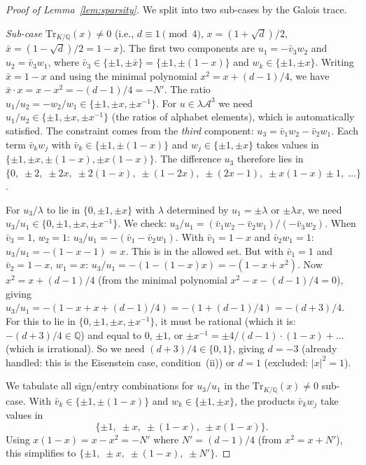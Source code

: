 \documentclass[12pt,a4paper]{article}
\newcommand{\Q}{\mathbb{Q}}
\newcommand{\Tr}[1]{\mathrm{Tr}_{K/\Q}\!\left(#1\right)}
\begin{document}
\begin{proof}[Proof of Lemma~\ref{lem:sparsity}]
We split into two sub-cases by the Galois trace.

\emph{Sub-case $\Tr{x} \neq 0$} (i.e., $d \equiv 1 \pmod{4}$,
$x = (1{+}\sqrt{d})/2$, $\bar{x} = (1{-}\sqrt{d})/2 = 1 - x$).
The first two components are $u_1 = -\bar{v}_3 w_2$ and
$u_2 = \bar{v}_3 w_1$, where $\bar{v}_3 \in \{\pm 1, \pm\bar{x}\}
= \{\pm 1, \pm(1{-}x)\}$ and $w_k \in \{\pm 1, \pm x\}$.
Writing $\bar{x} = 1 - x$ and using the minimal polynomial
$x^2 = x + (d{-}1)/4$, we have $\bar{x} \cdot x = x - x^2
= -(d{-}1)/4 = -N'$.  The ratio $u_1/u_2 = -w_2/w_1 \in \{\pm 1, \pm x,
\pm x^{-1}\}$.  For $u \in \lambda\mathcal{A}^3$ we need
$u_1/u_2 \in \{\pm 1, \pm x, \pm x^{-1}\}$ (the ratios of alphabet
elements), which is automatically satisfied.  The constraint comes
from the \emph{third} component: $u_3 = \bar{v}_1 w_2 - \bar{v}_2
w_1$.  Each term $\bar{v}_k w_j$ with $\bar{v}_k \in \{\pm 1,
\pm(1{-}x)\}$ and $w_j \in \{\pm 1, \pm x\}$ takes values in
$\{\pm 1, \pm x, \pm(1{-}x), \pm x(1{-}x)\}$.
The difference $u_3$ therefore lies in
$\{0,\;\pm 2,\;\pm 2x,\;\pm 2(1{-}x),\;\pm(1{-}2x),\;
\pm(2x{-}1),\;\pm x(1{-}x) \pm 1,\;\ldots\}$.

For $u_3/\lambda$ to lie in $\{0, \pm 1, \pm x\}$ with $\lambda$
determined by $u_1 = \pm\lambda$ or $\pm\lambda x$, we need
$u_3/u_1 \in \{0, \pm 1, \pm x, \pm x^{-1}\}$.  We check:
$u_3/u_1 = (\bar{v}_1 w_2 - \bar{v}_2 w_1)/(-\bar{v}_3 w_2)$.
When $\bar{v}_3 = 1$, $w_2 = 1$: $u_3/u_1 = -(\bar{v}_1 -
\bar{v}_2 w_1)$.  With $\bar{v}_1 = 1{-}x$ and $\bar{v}_2 w_1 = 1$:
$u_3/u_1 = -(1{-}x{-}1) = x$.  This is in the allowed set.
But with $\bar{v}_1 = 1$ and $\bar{v}_2 = 1{-}x$, $w_1 = x$:
$u_3/u_1 = -(1 - (1{-}x)x) = -(1 - x + x^2)$.  Now
$x^2 = x + (d{-}1)/4$ (from the minimal polynomial
$x^2 - x - (d{-}1)/4 = 0$), giving
$u_3/u_1 = -(1 - x + x + (d{-}1)/4) = -(1 + (d{-}1)/4) =
-(d{+}3)/4$.  For this to lie in $\{0, \pm 1, \pm x, \pm x^{-1}\}$,
it must be rational (which it is: $-(d{+}3)/4 \in \Q$) and equal
to $0$, $\pm 1$, or $\pm x^{-1} = \pm 4/(d{-}1) \cdot (1{-}x)
+ \ldots$ (which is irrational).  So we need $(d{+}3)/4 \in \{0, 1\}$,
giving $d = -3$ (already handled: this is the Eisenstein case,
condition~(ii)) or $d = 1$ (excluded: $|x|^2 = 1$).

We tabulate all sign/entry combinations for $u_3/u_1$ in the
$\Tr{x} \neq 0$ sub-case.  With
$\bar{v}_k \in \{\pm 1, \pm(1{-}x)\}$ and
$w_k \in \{\pm 1, \pm x\}$, the products $\bar{v}_k w_j$
take values in
\[
  \{\pm 1,\; \pm x,\; \pm(1{-}x),\; \pm x(1{-}x)\}.
\]
Using $x(1{-}x) = x - x^2 = -N'$ where $N' = (d{-}1)/4$
(from $x^2 = x + N'$), this simplifies to
$\{\pm 1,\; \pm x,\; \pm(1{-}x),\; \pm N'\}$.


\end{proof}
\end{document}
